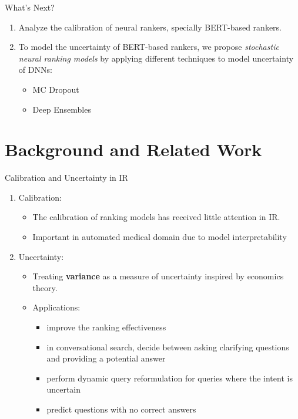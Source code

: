 \documentclass{beamer}
\begin{document}
\begin{frame}{What's Next?}
\begin{enumerate}
    \item Analyze the calibration of neural rankers, specially BERT-based rankers.
    \item To model the uncertainty of BERT-based rankers, we propose \textsl{stochastic neural ranking models} by applying different techniques to model uncertainty of DNNs:
        \begin{itemize}
            \item MC Dropout
            \item Deep Ensembles
        \end{itemize}
\end{enumerate}
\end{frame}


\section{Background and Related Work}
\begin{frame}{Calibration and Uncertainty in IR}
\begin{enumerate}
    \item Calibration: 
        \begin{itemize}
            \item The calibration of ranking models has received little attention in IR.
            \item Important in automated medical domain due to model interpretability
        \end{itemize}
    \item Uncertainty: 
        \begin{itemize}
            \item Treating \textbf{variance} as a measure of uncertainty inspired by economics theory.
            \item Applications:
                \begin{itemize}
                    \item improve the ranking effectiveness
                    \item in conversational search, decide between asking clarifying questions and providing a potential answer
                    \item perform dynamic query reformulation for queries where the intent is uncertain
                    \item predict questions with no correct answers
                \end{itemize}
        \end{itemize}
\end{enumerate}
    
\end{frame}
\end{document}
